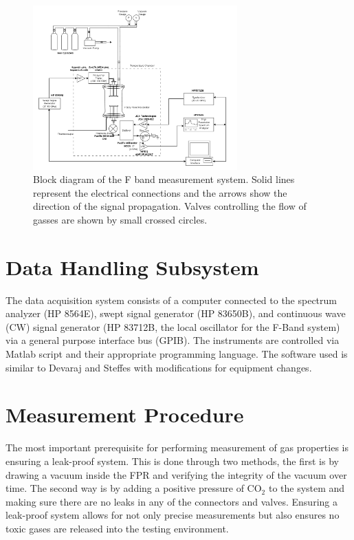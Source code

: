 \begin{figure}[H]
    \centering
	\includegraphics[width=0.7\textwidth]{./images/f-bandsystem.png}
	\caption{Block diagram of the F band measurement system. Solid lines represent the electrical connections and the arrows show the direction of the signal propagation. Valves controlling the flow of gasses are shown by small crossed circles.  }
    \label{fig:fbandimage}
\end{figure}

\section{Data Handling Subsystem}

The data acquisition system consists of a computer connected to the spectrum analyzer (HP 8564E), swept signal generator (HP 83650B), and continuous wave (CW) signal generator (HP 83712B, the local oscillator for the F-Band system) via a general purpose interface bus (GPIB). The instruments are controlled via Matlab script and their appropriate programming language. The software used is similar to Devaraj and Steffes \cite{system-description} \cite{Devaraj-thesis} with modifications for equipment changes.

\section{Measurement Procedure}

The most important prerequisite for performing measurement of gas properties is ensuring a leak-proof system. This is done through two methods, the first is by drawing a vacuum inside the FPR and verifying the integrity of the vacuum over time. The second way is by adding a positive pressure of CO$_2$ to the system and making sure there are no leaks in any of the connectors and valves. Ensuring a leak-proof system allows for not only precise measurements but also ensures no toxic gases are released into the testing environment.

